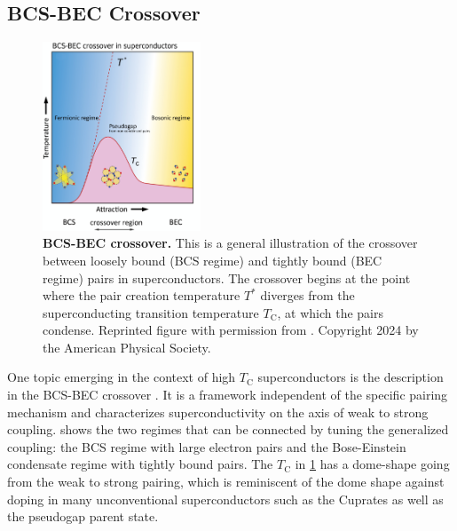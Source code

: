 \documentclass[../notes.tex]{subfiles}
\begin{document}
\subsection*{BCS-BEC Crossover}

\begin{figure}
	\centering
	\includegraphics[width=0.42\textwidth]{images/BCS-BEC crossover.png}
	\caption[BCS-BEC crossover.]{
		\textbf{BCS-BEC crossover.} This is a general illustration of the crossover between loosely bound (BCS regime) and tightly bound (BEC regime) pairs in superconductors. 
		The crossover begins at the point where the pair creation temperature \(T^*\) diverges from the superconducting transition temperature \(T_{\mathrm{C}}\), at which the pairs condense.
		Reprinted figure with permission from \cite{chenWhenSuperconductivityCrosses2024}. Copyright 2024 by the American Physical Society.}
	\label{fig:BCS-BEC-crossover}
\end{figure}
One topic emerging in the context of high \(T_{\mathrm{C}}\) superconductors is the description in the BCS-BEC crossover \cite{chenWhenSuperconductivityCrosses2024}.
It is a framework independent of the specific pairing mechanism and characterizes superconductivity on the axis of weak to strong coupling.
 shows the two regimes that can be connected by tuning the generalized coupling: the BCS regime with large electron pairs and the Bose-Einstein condensate regime with tightly bound pairs.
The \(T_{\mathrm{C}}\) in \cref{fig:BCS-BEC-crossover} has a dome-shape going from the weak to strong pairing, which is reminiscent of the dome shape against doping in many unconventional superconductors such as the Cuprates as well as the pseudogap parent state.
\end{document}
